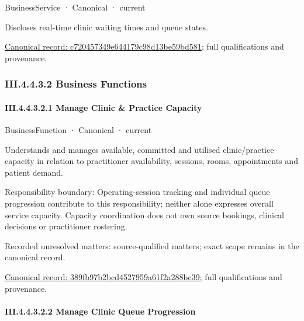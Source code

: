 \label{element:c720457349e644179c98d13be59bd581}
{\small BusinessService · Canonical · current}\par

Discloses real-time clinic waiting times and queue states.


{\footnotesize \href{../../../../continuum/business/business-service/c720457349e644179c98d13be59bd581.md}{Canonical record: c720457349e644179c98d13be59bd581}; full qualifications and provenance.}\par
\subsubsection*{III.4.4.3.2 Business Functions}
\label{navigation:III.4.4.3.2}

\paragraph*{III.4.4.3.2.1 Manage Clinic \& Practice Capacity}
\label{navigation:III.4.4.3.2.1}

\label{element:389fb97b2bcd4527959a61f2a288bc39}
{\small BusinessFunction · Canonical · current}\par

Understands and manages available, committed and utilised clinic/practice capacity in relation to practitioner availability, sessions, rooms, appointments and patient demand.



Responsibility boundary: Operating-session tracking and individual queue progression contribute to this responsibility; neither alone expresses overall service capacity. Capacity coordination does not own source bookings, clinical decisions or practitioner rostering.


{\small Recorded unresolved matters: source-qualified matters; exact scope remains in the canonical record.}\par
{\footnotesize \href{../../../../continuum/business/business-function/389fb97b2bcd4527959a61f2a288bc39.md}{Canonical record: 389fb97b2bcd4527959a61f2a288bc39}; full qualifications and provenance.}\par
\paragraph*{III.4.4.3.2.2 Manage Clinic Queue Progression}
\label{navigation:III.4.4.3.2.2}

